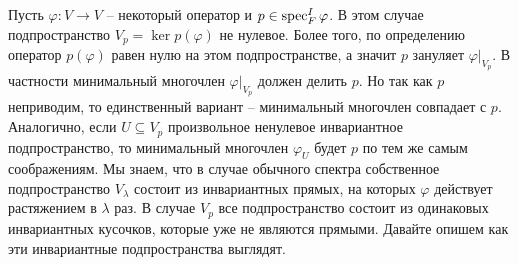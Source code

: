 Пусть $\varphi\colon V\to V$ -- некоторый оператор и $p\in \operatorname{spec}^I_F\varphi$.
В этом случае подпространство $V_p = \ker p(\varphi)$ не нулевое.
Более того, по определению оператор $p(\varphi)$ равен нулю на этом подпространстве, а значит $p$ зануляет $\varphi|_{V_p}$.
В частности минимальный многочлен $\varphi|_{V_p}$ должен делить $p$.
Но так как $p$ неприводим, то единственный вариант -- минимальный многочлен совпадает с $p$.
Аналогично, если $U\subseteq V_p$ произвольное ненулевое инвариантное подпространство, то минимальный многочлен $\varphi_U$ будет $p$ по тем же самым соображениям.
Мы знаем, что в случае обычного спектра собственное подпространство $V_\lambda$ состоит из инвариантных прямых, на которых $\varphi$ действует растяжением в $\lambda$ раз.
В случае $V_p$ все подпространство состоит из одинаковых инвариантных кусочков, которые уже не являются прямыми.
Давайте опишем как эти инвариантные подпространства выглядят.

